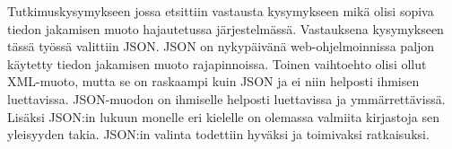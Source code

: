 Tutkimuskysymykseen jossa etsittiin vastausta kysymykseen mikä olisi sopiva tiedon jakamisen muoto hajautetussa järjestelmässä. Vastauksena kysymykseen tässä työssä valittiin JSON. JSON on nykypäivänä web-ohjelmoinnissa paljon käytetty tiedon jakamisen muoto rajapinnoissa. Toinen vaihtoehto olisi ollut XML-muoto, mutta se on raskaampi kuin JSON ja ei niin helposti ihmisen luettavissa. JSON-muodon on ihmiselle helposti luettavissa ja ymmärrettävissä. Lisäksi JSON:in lukuun monelle eri kielelle on olemassa valmiita kirjastoja sen yleisyyden takia. JSON:in valinta todettiin hyväksi ja toimivaksi ratkaisuksi. \cite{the-rise-and-rise-of-json, why-json-is-better-than-xml}